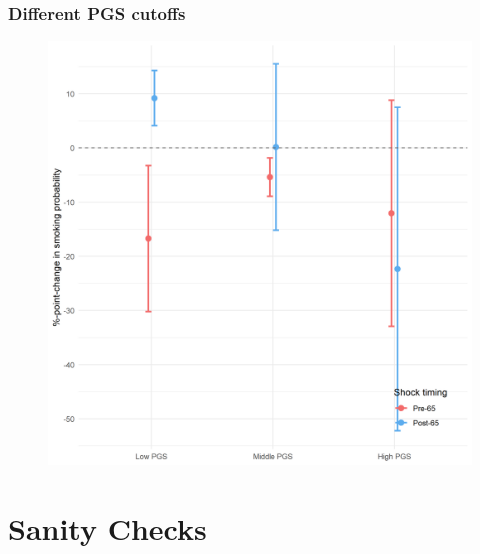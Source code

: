 \documentclass[10pt,compress,xcolor=dvipsnames,aspectratio=169]{beamer}    %
\newcounter{ex}
\newcommand{\1}[1]{\mathrm{1\hspace*{-2.5pt}l}[#1]}	%
\begin{document}
\begin{frame}
\frametitle{Different PGS cutoffs}

\begin{figure}[hbtp]
\centering
\includegraphics[height=0.8\textheight]{../../3_output/shock_effects/robustness_6070_3pgs_cv.png}
\label{fig:3pgs}
\end{figure}

\end{frame}

\section{Sanity Checks}
\end{document}
